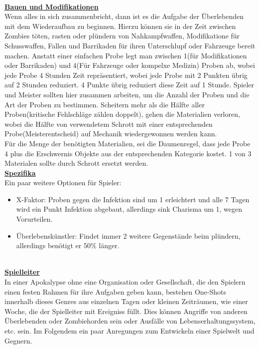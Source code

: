 \documentclass[twoside,a4paper]{minimal}
\begin{document}
\begin{multicols*}{3}
\begin{itemize}
\end{itemize}
\textbf{\uline{\\Bauen und Modifikationen}}
\\Wenn alles in sich zusammenbricht, dann ist es die Aufgabe der Überlebenden mit dem Wiederaufbau zu beginnen. Hierzu können sie in der Zeit zwischen Zombies töten, rasten oder plündern von Nahkampfwaffen, Modifikatione für Schusswaffen, Fallen und Barrikaden für ihren Unterschlupf oder Fahrzeuge bereit machen. Anstatt einer einfachen Probe legt man zwischen 1(für Modifikationen oder Barrikaden) und 4(Für Fahrzeuge oder kompelxe Medizin) Proben ab, wobei jede Probe 4 Stunden Zeit repräsentiert, wobei jede Probe mit 2 Punkten übrig auf 2 Stunden reduziert. 4 Punkte übrig reduziert diese Zeit auf 1 Stunde. Spieler und Meister sollten hier zusammen arbeiten, um die Anzahl der Proben und die Art der Proben zu bestimmen. Scheitern mehr als die Hälfte aller Proben(kritische Fehlschläge zählen doppelt), gehen die Materialien verloren, wobei die Hälfte von verwendetem Schrott mit einer entsprechenden Probe(Meisterentscheid) auf Mechanik wiedergewonnen werden kann. 
\\Für die Menge der benötigten Materialien, sei die Daumenregel, dass jede Probe 4 plus die Erschwernis Objekte aus der entsprechenden Kategorie kostet. 1 von 3 Materialen sollte durch Schrott ersetzt werden.
\textbf{\uline{\\Spezifika}}
\\Ein paar weitere Optionen für Spieler:
\begin{itemize}
\item X-Faktor: Proben gegen die Infektion sind um 1 erleichtert und alle 7 Tagen wird ein Punkt Infektion abgebaut, allerdings sink Charisma um 1, wegen Vorurteilen.
\item Überlebenskünstler: Findet immer 2 weitere Gegenstände beim plündern, allerdings benötigt er 50\% länger.
\end{itemize}
\textbf{\uline{\\Spielleiter}}
\\In einer Apokalypse ohne eine Organisation oder Gesellschaft, die den Spielern einen festen Rahmen für ihre Aufgaben geben kann, bestehen One-Shots innerhalb dieses Genres aus einzelnen Tagen oder kleinen Zeiträumen, wie einer Woche, die der Spielleiter mit Ereigniss füllt. Dies können Angriffe von anderen Überlebenden oder Zombiehorden sein oder Ausfälle von Lebenserhaltungssystem, etc. sein. Im Folgendem ein paar Anregungen zum Entwickeln einer Spielwelt und Gegnern. 

\end{multicols*}
\end{document}
